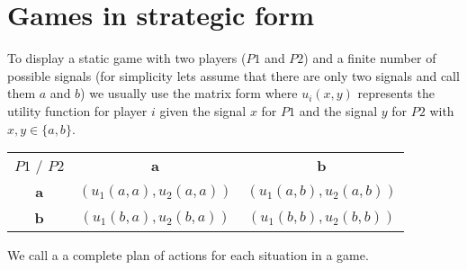 
\section{Games in strategic form}
To display a static game with two players ($P1$ and $P2$) and a finite number of possible signals (for simplicity lets assume that there are only two signals and call them $a$ and $b$) we usually use the matrix form where $u_{i}(x, y)$ represents the utility function for player $i$ given the signal $x$ for $P1$ and the signal $y$ for $P2$ with $x, y \in \{ a, b\}$.
\begin{center}
	\begin{tabular}{|c|c|c|}
		\hline\hline
  			$P1$ / $P2$ & \textbf{a} & \textbf{b} \\
         		\cline{1-3}
   					\textbf{a} & $( u_{1}(a, a) , u_{2}(a, a))$ & $(u_{1}(a, b), u_{2}(a, b))$	\arrayrulewidth2pt \\
            	\cline{1-3}
   					\textbf{b} & $( u_{1}(b, a), u_{2}(b, a))$ & $(u_{1}(b, b), u_{2}(b, b))$\\ \hline\hline
	\end{tabular}	
\end{center}

We call a  a complete plan of actions for each situation in a game.

